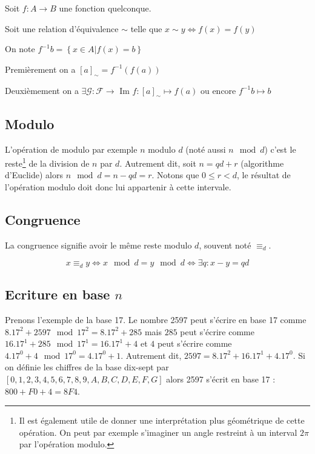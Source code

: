 \documentclass[a4paper,10pt]{article}
\begin{document}
Soit $f : A \rightarrow B$ une fonction quelconque.

Soit une relation d'équivalence $\sim$ telle que $x \sim y \Leftrightarrow f(x) = f(y)$

On note $f^{-1}b = \left\lbrace x \in A \vert f(x) = b \right\rbrace$

Premièrement on a $\left[ a \right]_\sim = f^{-1} (f(a))$

Deuxièmement on a $\exists \mathcal{G} : \mathcal{F} \rightarrow \mbox{ Im } f : \left[ a \right]_\sim \mapsto f(a) \mbox{ ou encore } f^{-1} b \mapsto b$ 

\subsection{Modulo}
L'opération de modulo par exemple $n$ modulo $d$ (noté aussi $n \mod d$) c'est le reste\footnote{Il est également utile de donner une interprétation plus géométrique de cette opération. On peut par exemple s'imaginer un angle restreint à un interval $2 \pi$ par l'opération modulo.} de la division de $n$ par $d$.
Autrement dit, soit $n = qd + r$ (algorithme d'Euclide) alors $n \mod d = n - qd = r$.
Notons que $0 \leq r < d$, le résultat de l'opération modulo doit donc lui appartenir à cette intervale.

\subsection{Congruence}

La congruence signifie avoir le même reste modulo $d$, souvent noté $\equiv_d$.

$$x \equiv_d y \Leftrightarrow x \mod d = y \mod d \Leftrightarrow \exists q : x - y = qd$$
\subsection{Ecriture en base $n$}
Prenons l'exemple de la base 17. Le nombre 2597 peut s'écrire en base 17 comme $8.17^2 + 2597 \mod 17^2 = 8.17^2 + 285$ mais $285$ peut s'écrire comme $16.17^1 + 285 \mod 17^1 = 16.17^1 + 4$ et $4$ peut s'écrire comme $4.17^0 + 4 \mod 17^0 = 4.17^0 + 1$. Autrement dit, $2597 = 8.17^2 + 16.17^1 + 4.17^0$. Si on définie les chiffres de la base dix-sept par $\left[ 0, 1, 2, 3, 4, 5, 6 , 7, 8, 9 , A, B, C, D, E, F, G \right]$ alors 2597 s'écrit en base 17 : $800 + F0 + 4 = 8F4$.
\end{document}
